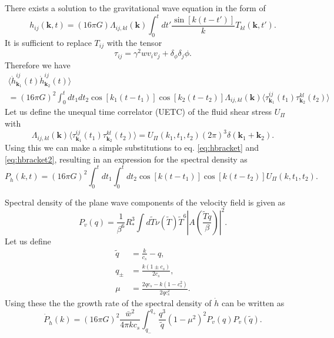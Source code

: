 There exists a solution to the gravitational wave equation in the form of
\begin{equation}
h_{ij} (\bm{k},t) = (16 \pi G) \Lambda_{ij,kl}(\bm{k}) \int_0^t dt' \frac{\sin [k(t-t')]}{k} T_{kl}(\bm{k},t').
\end{equation}
It is sufficient to replace $T_{ij}$ with the tensor
\begin{equation}
\tau_{ij} = \gamma^2 w v_i v_j + \delta_ \phi \delta_j \phi.
\end{equation}
Therefore we have
\begin{multline}
\langle \dot{h}_{\bm{k}_1}^{ij}(t) \dot{h}_{\bm{k}_2}^{ij}(t) \rangle \\
= (16 \pi G)^2 \int_0^t dt_1 dt_2 \cos [k_1(t-t_1)] \cos [k_2(t-t_2)] \Lambda_{ij,kl}(\bm{k})
\langle \tau_{\bm{k}_1}^{ij}(t_1) \tau_{\bm{k}_2}^{kl}(t_2) \rangle
\end{multline}
Let us define the unequal time correlator (UETC) of the fluid shear stress $U_\Pi$ with
\begin{equation}
\Lambda_{ij,kl}(\bm{k}) \langle \tau_{\bm{k}_1}^{ij}(t_1) \tau_{\bm{k}_2}^{kl}(t_2) \rangle
= U_\Pi (k_1, t_1, t_2) (2 \pi)^3 \delta(\bm{k}_1 + \bm{k}_2).
\label{eq:hbracket2}
\end{equation}
Using this we can make a simple substitutions to eq. \eqref{eq:hbracket} and \eqref{eq:hbracket2},
resulting in an expression for the spectral density as
\begin{equation}
P_{\dot{h}} (k,t) = (16 \pi G)^2 \int_0^t dt_1 \int_0^t dt_2 \cos [k(t-t_1)] \cos [k(t-t_2)] U_\Pi (k, t_1, t_2).
\label{eq:p_dot_h}
\end{equation}

Spectral density of the plane wave components of the velocity field is given as
\cite[eq. 4.17]{hindmarsh_gw_pt_2019}
\begin{equation}
P_v(q) = \frac{1}{\beta^6}{R_*^3} \int d\tilde{T} \nu(\tilde{T}) \tilde{T}^6 |A(\frac{\tilde{T}q}{\beta})|^2.
\label{eq:spec_den_v}
\end{equation}
Let us define
\begin{align}
\tilde{q} &= \frac{k}{c_s} - q, \\
q_\pm &= \frac{k(1 \pm c_s)}{2 c_s}, \\
\mu &= \frac{2qc_s - k(1 - c_s^2)}{2qc_s^2}.
\end{align}
Using these the the growth rate of the spectral density of $\dot{h}$ can be written as
\begin{equation}
\dot{P}_{\dot{h}} (k) = (16 \pi G)^2 \frac{\bar{w}^2}{4 \pi k c_s} \int_{q_-}^{q_+} \frac{q^3}{\tilde{q}} (1 - \mu^2)^2 P_v(q) P_v(\tilde{q}).
\label{eq:dot_p_dot_h}
\end{equation}

